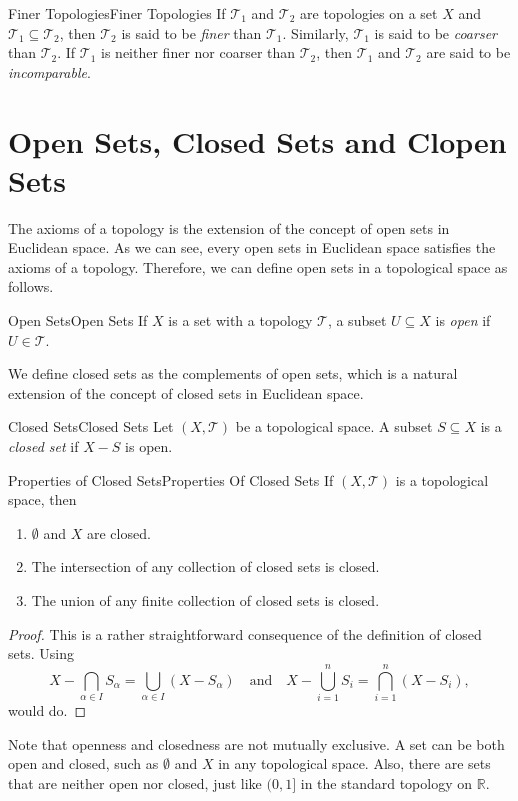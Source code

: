 \documentclass[../main.tex]{subfiles}
\begin{document}
\begin{definition}{Finer Topologies}{Finer Topologies}
	If $\mathcal{T}_1$ and $\mathcal{T}_2$ are topologies on a set $X$ and $\mathcal{T}_1 \subseteq \mathcal{T}_2$, then $\mathcal{T}_2$ is said to be \emph{finer} than $\mathcal{T}_1$. Similarly, $\mathcal{T}_1$ is said to be \emph{coarser} than $\mathcal{T}_2$. If $\mathcal{T}_1$ is neither finer nor coarser than $\mathcal{T}_2$, then $\mathcal{T}_1$ and $\mathcal{T}_2$ are said to be \emph{incomparable}.
\end{definition}

\section{Open Sets, Closed Sets and Clopen Sets}

The axioms of a topology is the extension of the concept of open sets in Euclidean space. As we can see, every open sets in Euclidean space satisfies the axioms of a topology. Therefore, we can define open sets in a topological space as follows.

\begin{definition}{Open Sets}{Open Sets}
If $X$ is a set with a topology $\mathcal{T}$, a subset $U \subseteq X$ is \emph{open} if $U \in \mathcal{T}$.
\end{definition}

We define closed sets as the complements of open sets, which is a natural extension of the concept of closed sets in Euclidean space.
\begin{definition}{Closed Sets}{Closed Sets}
	Let $\left(X,\mathcal{T}\right)$ be a topological space. A subset $S \subseteq X$ is a \emph{closed set} if $X - S$ is open.
\end{definition}

\begin{theorem}{Properties of Closed Sets}{Properties Of Closed Sets}
	If $\left(X,\mathcal{T}\right)$ is a topological space, then
\begin{enumerate}
	\item $\emptyset$ and $X$ are closed.
	\item The intersection of any collection of closed sets is closed.
	\item The union of any finite collection of closed sets is closed.
\end{enumerate}
\end{theorem}
\begin{proof}
This is a rather straightforward consequence of the definition of closed sets. Using
\begin{equation*}
	X - \bigcap_{\alpha \in I} S_{\alpha} = \bigcup_{\alpha \in I} (X - S_{\alpha}) \quad \text{and} \quad X - \bigcup_{i=1}^n S_i = \bigcap_{i=1}^n (X - S_i),
\end{equation*}
would do.
\end{proof}
\begin{remark}
	Note that openness and closedness are not mutually exclusive. A set can be both open and closed, such as $\emptyset $ and $X$ in any topological space. Also, there are sets that are neither open nor closed, just like $(0,1]$ in the standard topology on $\mathbb{R}$.
\end{remark}
\end{document}
